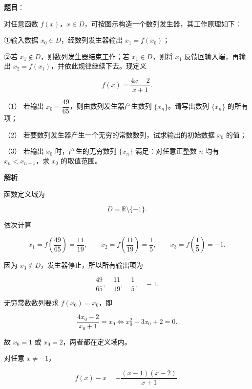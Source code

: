 \begin{answer}

\textbf{题目}：

对任意函数 $f(x)$，$x\in D$，可按图示构造一个数列发生器，其工作原理如下：

①输入数据 $x_0\in D$，经数列发生器输出 $x_1=f(x_0)$；

②若 $x_1\notin D$，则数列发生器结束工作；若 $x_1\in D$，则将 $x_1$ 反馈回输入端，再输出 $x_2=f(x_1)$，并依此规律继续下去。现定义

\nopagebreak[4]
\[
f(x)=\frac{4x-2}{x+1}.
\]
\nopagebreak[4]
\begin{center}\end{center}
\nopagebreak[4]
（1） 若输出 $x_0=\dfrac{49}{65}$，则由数列发生器产生数列 $\{x_n\}$。请写出数列 $\{x_n\}$ 的所有项；

（2） 若要数列发生器产生一个无穷的常数数列，试求输出的初始数据 $x_0$ 的值；

（3） 若输出 $x_0$ 时，产生的无穷数列 $\{x_n\}$ 满足：对任意正整数 $n$ 均有 $x_n<x_{n+1}$，求 $x_0$ 的取值范围。

\textbf{解析}

函数定义域为

\nopagebreak[4]
\[
D=\mathbb R\setminus\{-1\}.
\]


依次计算

\nopagebreak[4]
\[
x_1=f\left(\frac{49}{65}\right)=\frac{11}{19},\qquad
x_2=f\left(\frac{11}{19}\right)=\frac15,\qquad
x_3=f\left(\frac15\right)=-1.
\]

因为 $x_3\notin D$，发生器停止，所以所有输出项为

\nopagebreak[4]
\[
\frac{49}{65},\quad\frac{11}{19},\quad\frac15,\quad-1.
\]


无穷常数数列要求 $f(x_0)=x_0$，即

\nopagebreak[4]
\[
\frac{4x_0-2}{x_0+1}=x_0
\Longleftrightarrow x_0^2-3x_0+2=0.
\]

故 $x_0=1$ 或 $x_0=2$，两者都在定义域内。


对任意 $x\ne-1$，

\nopagebreak[4]
\[
f(x)-x
=-\frac{(x-1)(x-2)}{x+1}.
\]


\end{answer}
